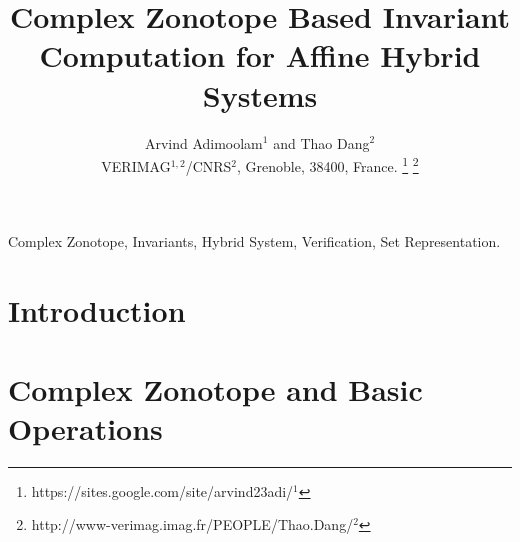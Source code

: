 \documentclass[journal]{./template/stylefiles/IEEEtran}
\begin{document}
\title{Complex Zonotope Based Invariant Computation for Affine Hybrid Systems}

\author{Arvind Adimoolam$^{1}$ and
        Thao Dang$^{2}$\\        
        \small{VERIMAG$^{1,2}$/CNRS$^{2}$, Grenoble, 38400, France.}        
        \thanks{
          {https://sites.google.com/site/arvind23adi/}$^{1}$
        }
        \thanks{
          {http://www-verimag.imag.fr/PEOPLE/Thao.Dang/}$^{2}$
          }
}

\maketitle

\begin{abstract}

\end{abstract}

\begin{IEEEkeywords}
Complex Zonotope, Invariants, Hybrid System, Verification, Set Representation.
\end{IEEEkeywords}

\section{Introduction}


\section{Complex Zonotope and Basic Operations}

\end{document}
